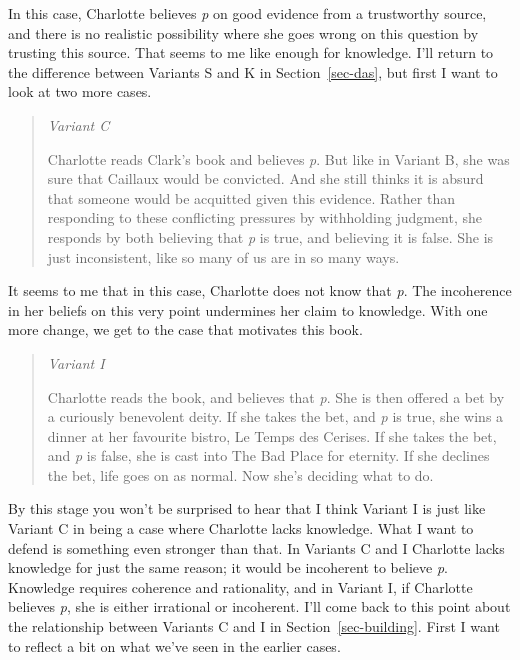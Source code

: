 \documentclass[
  10pt,
  letterpaper,
  twoside]{scrbook}
\begin{document}
In this case, Charlotte believes \emph{p} on good evidence from a
trustworthy source, and there is no realistic possibility where she goes
wrong on this question by trusting this source. That seems to me like
enough for knowledge. I'll return to the difference between Variants S
and K in Section~\ref{sec-das}, but first I want to look at two more
cases.

\begin{quote}
\emph{Variant C}

Charlotte reads Clark's book and believes \emph{p}. But like in Variant
B, she was sure that Caillaux would be convicted. And she still thinks
it is absurd that someone would be acquitted given this evidence. Rather
than responding to these conflicting pressures by withholding judgment,
she responds by both believing that \emph{p} is true, and believing it
is false. She is just inconsistent, like so many of us are in so many
ways.
\end{quote}

It seems to me that in this case, Charlotte does not know that \emph{p}.
The incoherence in her beliefs on this very point undermines her claim
to knowledge. With one more change, we get to the case that motivates
this book.

\begin{quote}
\emph{Variant I}

Charlotte reads the book, and believes that \emph{p}. She is then
offered a bet by a curiously benevolent deity. If she takes the bet, and
\emph{p} is true, she wins a dinner at her favourite bistro, Le Temps
des Cerises. If she takes the bet, and \emph{p} is false, she is cast
into The Bad Place for eternity. If she declines the bet, life goes on
as normal. Now she's deciding what to do.
\end{quote}

By this stage you won't be surprised to hear that I think Variant I is
just like Variant C in being a case where Charlotte lacks knowledge.
What I want to defend is something even stronger than that. In Variants
C and I Charlotte lacks knowledge for just the same reason; it would be
incoherent to believe \emph{p}. Knowledge requires coherence and
rationality, and in Variant I, if Charlotte believes \emph{p}, she is
either irrational or incoherent. I'll come back to this point about the
relationship between Variants C and I in Section~\ref{sec-building}.
First I want to reflect a bit on what we've seen in the earlier cases.
\end{document}
